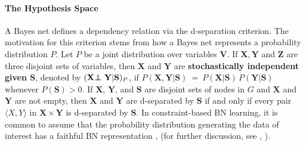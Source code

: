 \documentclass{elsarticle}%
\newcommand{\indep}{\ensuremath{\perp{}\!\!\!\!\!\!\!\perp{}}}
\renewcommand{\S}{\mathbf{{S}}}
\begin{document}
\paragraph{The Hypothesis Space} A Bayes net defines a dependency relation via the d-separation criterion. The motivation for this criterion stems from how a Bayes net represents a probability distribution $P$. 
Let $P$ be a joint
distribution over variables $\mathbf{V}$. If $\mathbf{X},\mathbf{Y}$ and $\mathbf{Z}$ are three disjoint sets of variables, then $\mathbf{X}$ and $\mathbf{Y}$ are
{\bf stochastically independent given $\S$}, denoted by 
$(\mathbf{X} \protect{\indep} \mathbf{Y}|\S)_{P}$, if 
$P(\mathbf{X},\mathbf{Y}|\S)\ =\ P(\mathbf{X}|\S)\, P(\mathbf{Y}|\S)$ whenever
$P(\S) > 0.$
If $\mathbf{X}$, $\mathbf{Y}$, and $\mathbf{S}$ are disjoint sets
 of nodes in $G$ and $\mathbf{X}$ and $\mathbf{Y}$ are not empty, then $\mathbf{X}$ and $\mathbf{Y}$
  are d-separated by $\mathbf{S}$ if and only if
  every pair $\langle X,Y\rangle$ in $\mathbf{X}\times\mathbf{Y}$ is d-separated
  by $\mathbf{S}$.
In constraint-based BN learning, it is common
to assume that the probability distribution generating the data of
interest has a {faithful} BN representation
\cite[Thm.3.2]{peter00:_causat}, %
\cite[Ch.2.4]{pearl00:_causal} (for further discussion, see
\cite{xiang96:_critic_remar_singl_link_searc}, \cite[Ch.8.1]{studeny05:_probab_condit_indep_struc}).
\end{document}
